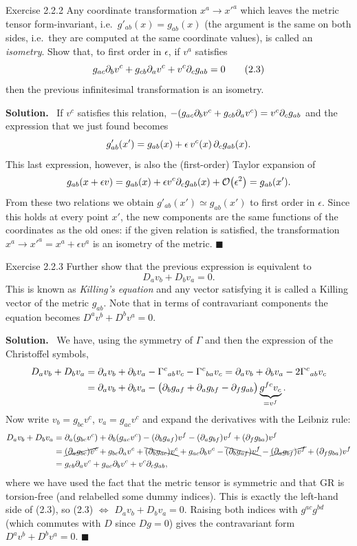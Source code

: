 \documentclass[11pt,a4paper]{article}
\numberwithin{equation}{subsection}
\newenvironment{solution}{\par\noindent\textbf{\textcolor{excol!70!black}{Solution.}}\ }{\hfill$\blacksquare$\par\medskip}
\begin{document}
\begin{problem}{Exercise 2.2.2}
Any coordinate transformation $x^a\to x'^a$ which leaves the metric tensor form-invariant, i.e.\ $g'_{ab}(x)=g_{ab}(x)$ (the argument is the same on both sides, i.e.\ they are computed at the same coordinate values), is called an \emph{isometry}. Show that, to first order in $\epsilon$, if $v^a$ satisfies
\[
  g_{ac}\partial_bv^c+g_{cb}\partial_av^c+v^c\partial_cg_{ab}=0 \tag{2.3}
\]
then the previous infinitesimal transformation is an isometry.
\end{problem}
\begin{solution}
If $v^c$ satisfies this relation, $-(g_{ac}\partial_bv^c+g_{cb}\partial_av^c)=v^c\partial_cg_{ab}$ and the expression that we just found becomes
\[
  g'_{ab}(x')=g_{ab}(x)+\epsilon\,v^c(x)\,\partial_cg_{ab}(x).
\]
This last expression, however, is also the (first-order) Taylor expansion of
\[
  g_{ab}(x+\epsilon v)=g_{ab}(x)+\epsilon v^c\partial_cg_{ab}(x)+\mathcal{O}\!\left(\epsilon^2\right)=g_{ab}(x').
\]
From these two relations we obtain $g'_{ab}(x')\simeq g_{ab}(x')$ to first order in $\epsilon$. Since this holds at every point $x'$, the new components are the same functions of the coordinates as the old ones: if the given relation is satisfied, the transformation $x^a\to x'^a=x^a+\epsilon v^a$ is an isometry of the metric.
\end{solution}

\begin{problem}{Exercise 2.2.3}
Further show that the previous expression is equivalent to
\[
  D_av_b+D_bv_a=0. \tag{2.4}
\]
This is known as \emph{Killing's equation} and any vector satisfying it is called a Killing vector of the metric $g_{ab}$. Note that in terms of contravariant components the equation becomes $D^av^b+D^bv^a=0$.
\end{problem}
\begin{solution}
We have, using the symmetry of $\Gamma$ and then the expression of the Christoffel symbols,
\begin{align*}
  D_av_b+D_bv_a&=\partial_av_b+\partial_bv_a-\Gamma^c{}_{ab}v_c-\Gamma^c{}_{ba}v_c=\partial_av_b+\partial_bv_a-2\Gamma^c{}_{ab}v_c\\
  &=\partial_av_b+\partial_bv_a-\big(\partial_bg_{af}+\partial_ag_{bf}-\partial_fg_{ab}\big)\underbrace{g^{fc}v_c}_{=v^f}.
\end{align*}
Now write $v_b=g_{bc}v^c$, $v_a=g_{ac}v^c$ and expand the derivatives with the Leibniz rule:
\begin{align*}
  D_av_b+D_bv_a&=\partial_a(g_{bc}v^c)+\partial_b(g_{ac}v^c)-(\partial_bg_{af})v^f-(\partial_ag_{bf})v^f+(\partial_fg_{ba})v^f\\
  &=\cancel{(\partial_ag_{bc})v^c}+g_{bc}\partial_av^c+\bcancel{(\partial_bg_{ac})v^c}+g_{ac}\partial_bv^c-\bcancel{(\partial_bg_{af})v^f}-\cancel{(\partial_ag_{bf})v^f}+(\partial_fg_{ba})v^f\\
  &=g_{cb}\partial_av^c+g_{ac}\partial_bv^c+v^c\partial_cg_{ab},
\end{align*}
where we have used the fact that the metric tensor is symmetric and that GR is torsion-free (and relabelled some dummy indices). This is exactly the left-hand side of (2.3), so (2.3) $\Longleftrightarrow$ $D_av_b+D_bv_a=0$. Raising both indices with $g^{ac}g^{bd}$ (which commutes with $D$ since $Dg=0$) gives the contravariant form $D^av^b+D^bv^a=0$.
\end{solution}
\end{document}
